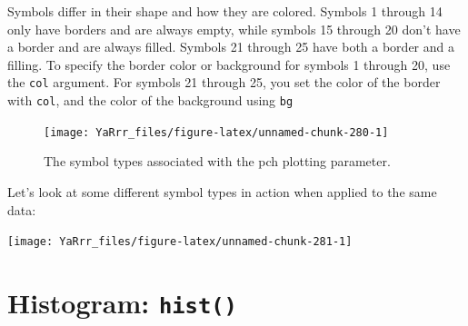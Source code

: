 \documentclass[]{book}
\theoremstyle{definition}
\theoremstyle{definition}
\theoremstyle{remark}
\begin{document}
Symbols differ in their shape and how they are colored. Symbols 1
through 14 only have borders and are always empty, while symbols 15
through 20 don't have a border and are always filled. Symbols 21 through
25 have both a border and a filling. To specify the border color or
background for symbols 1 through 20, use the \texttt{col} argument. For
symbols 21 through 25, you set the color of the border with
\texttt{col}, and the color of the background using \texttt{bg}

\begin{figure}

{\centering \texttt{[image: YaRrr\_files/figure-latex/unnamed-chunk-280-1]} 

}

\caption{The symbol types associated with the pch plotting parameter.}\label{fig:unnamed-chunk-280}
\end{figure}

Let's look at some different symbol types in action when applied to the
same data:

\begin{center}\texttt{[image: YaRrr\_files/figure-latex/unnamed-chunk-281-1]} \end{center}

\section{\texorpdfstring{Histogram:
\texttt{hist()}}{Histogram: hist()}}\label{histogram-hist}
\end{document}
